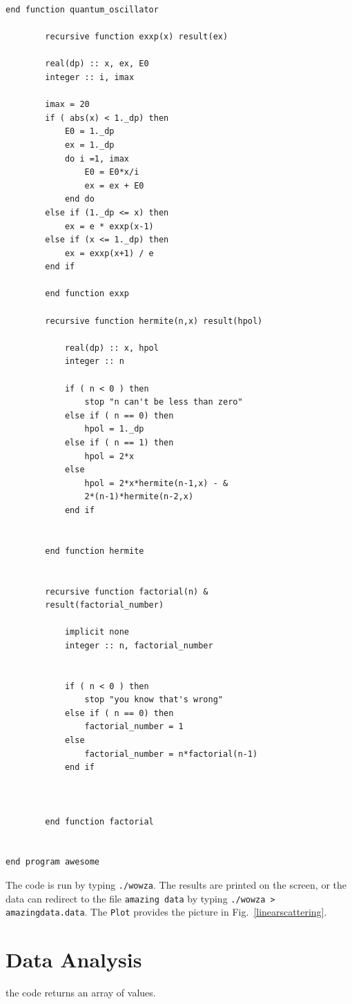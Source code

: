 \documentclass[12pt]{article}
\begin{document}
\begin{lstlisting}[frame=single,caption={{\tt oscillator.f95}},label=scattering95]
		end function quantum_oscillator

		recursive function exxp(x) result(ex)

		real(dp) :: x, ex, E0
		integer :: i, imax

		imax = 20
		if ( abs(x) < 1._dp) then
			E0 = 1._dp
			ex = 1._dp
			do i =1, imax
				E0 = E0*x/i
				ex = ex + E0
			end do
		else if (1._dp <= x) then
			ex = e * exxp(x-1)
		else if (x <= 1._dp) then
			ex = exxp(x+1) / e
		end if

		end function exxp 

		recursive function hermite(n,x) result(hpol)

			real(dp) :: x, hpol
			integer :: n

			if ( n < 0 ) then
				stop "n can't be less than zero"
			else if ( n == 0) then
				hpol = 1._dp
			else if ( n == 1) then
				hpol = 2*x
			else
				hpol = 2*x*hermite(n-1,x) - &
				2*(n-1)*hermite(n-2,x)
			end if 


		end function hermite


		recursive function factorial(n) &
		result(factorial_number)

			implicit none
			integer :: n, factorial_number


			if ( n < 0 ) then
				stop "you know that's wrong"
			else if ( n == 0) then
				factorial_number = 1
			else
				factorial_number = n*factorial(n-1)
			end if 



		end function factorial


end program awesome

\end{lstlisting}


The code is run by typing {\tt ./wowza}. The results are printed on the screen, or the data can redirect to the file {\tt amazing data} by typing {\tt ./wowza > amazingdata.data}. The {\tt Plot} provides the picture in Fig.\ \ref{linearscattering}. 

\section{Data Analysis}

the code returns an array of values.
\end{document}

